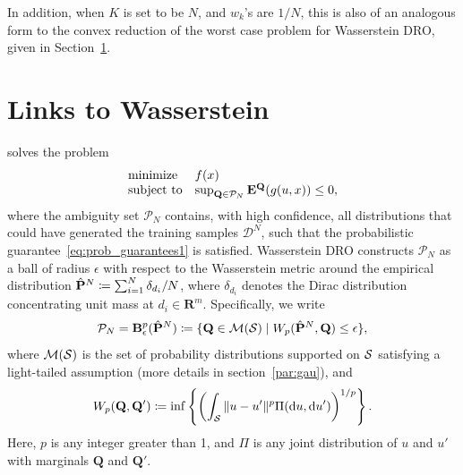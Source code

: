 \documentclass[12pt]{article}
\theoremstyle{thmstyleone}%
\theoremstyle{thmstyletwo}%
\theoremstyle{thmstylethree}%
\newcommand{\reviewChanges}{}
\begin{document}
\reviewChanges{In addition, when $K$ is set to be $N$, and $w_k$'s are $1/N$, this is also of an analogous form to the convex reduction of the worst case problem for Wasserstein \gls{DRO}, given in Section~\ref{sub:connectionsdro}. }


\section{Links to Wasserstein }
\label{sub:connectionsdro}
 solves the problem
\begin{equation}
	\label{eq:dro_prob}
	\begin{array}{ll}
		\mbox{minimize} & f(x)\\
		\mbox{subject to} &   \sup_{\mathbf{Q}\in \mathcal{P}_N} \mathbf{E}^\mathbf{Q}(g(u,x))  \le 0,
	\end{array}
	\end{equation}
where the ambiguity set $\mathcal{P}_N$ contains, with high confidence, all distributions that could have generated the training samples $\mathcal{D}^N$, such that the probabilistic guarantee~\eqref{eq:prob_guarantees1} is satisfied.
Wasserstein \gls{DRO} constructs $\mathcal{P}_N$ as a ball of radius $\epsilon$ with respect to the Wasserstein metric around the empirical distribution ${\hat{{\mathbf P}}^N \coloneqq \sum_{i=1}^N \delta_{d_i}/N}$, where $\delta_{d_i}$ denotes the Dirac distribution concentrating unit mass at $d_i \in \mathbf{R}^m$.
Specifically, we write
\begin{equation*}
	\label{eq:Wball}
	\mathcal{P}_N = \mathbf{B}_\epsilon^p (\hat{{\mathbf P}}^N) \coloneqq \{\mathbf{Q} \in \mathcal{M}(\mathcal{S}) \mid W_p(\hat{{\mathbf P}}^N,\mathbf{Q}) \leq \epsilon \},
\end{equation*}
where $\mathcal{M}(\mathcal{S})$ is the set of probability distributions supported on $\mathcal{S}$ satisfying a light-tailed assumption (more details in section~\ref{par:gau}), and
$$W_p(\mathbf{Q},\mathbf{Q'}) \define \inf \left\{ \left(\int_\reviewChanges{\supp} \|u - u'\|^p \Pi (\dif u,\dif u') \right)^{1/p} \right\}.$$
Here, $p$ is any integer greater than 1, and $\Pi$ is any joint distribution of $u$ and $u'$ with marginals $\mathbf{Q}$ and $\mathbf{Q'}$.
\end{document}
